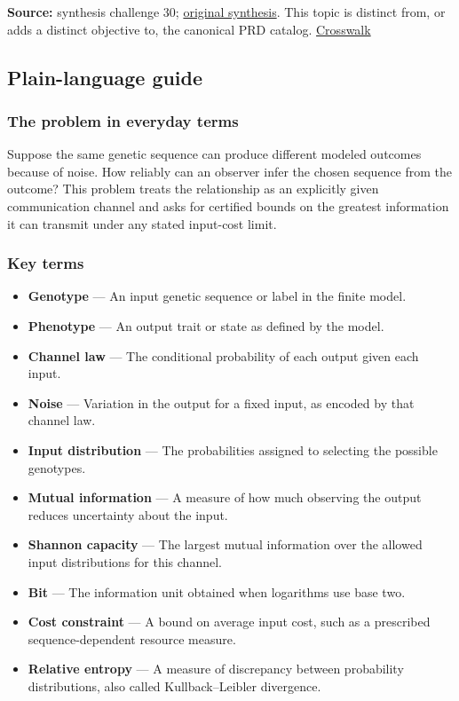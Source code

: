 \documentclass[
  11pt,
]{article}
\begin{document}
\textbf{Source:} synthesis challenge 30;
\href{https://github.com/rick-stevens-ai/Pure-Thought/blob/main/NOTES/30-Most-Compelling-Pure-Thought-AI-Challenges.md}{original
synthesis}. This topic is distinct from, or adds a distinct objective
to, the canonical PRD catalog.
\href{https://github.com/rick-stevens-ai/Pure-Thought/blob/main/reviews/SYNTHESIS-CROSSWALK.md}{Crosswalk}

\subsection{Plain-language guide}

\subsubsection{The problem in everyday terms}

Suppose the same genetic sequence can produce different modeled outcomes
because of noise. How reliably can an observer infer the chosen sequence
from the outcome? This problem treats the relationship as an explicitly
given communication channel and asks for certified bounds on the
greatest information it can transmit under any stated input-cost limit.

\subsubsection{Key terms}

\begin{itemize}
\item
  \textbf{Genotype} --- An input genetic sequence or label in the finite
  model.
\item
  \textbf{Phenotype} --- An output trait or state as defined by the
  model.
\item
  \textbf{Channel law} --- The conditional probability of each output
  given each input.
\item
  \textbf{Noise} --- Variation in the output for a fixed input, as
  encoded by that channel law.
\item
  \textbf{Input distribution} --- The probabilities assigned to
  selecting the possible genotypes.
\item
  \textbf{Mutual information} --- A measure of how much observing the
  output reduces uncertainty about the input.
\item
  \textbf{Shannon capacity} --- The largest mutual information over the
  allowed input distributions for this channel.
\item
  \textbf{Bit} --- The information unit obtained when logarithms use
  base two.
\item
  \textbf{Cost constraint} --- A bound on average input cost, such as a
  prescribed sequence-dependent resource measure.
\item
  \textbf{Relative entropy} --- A measure of discrepancy between
  probability distributions, also called Kullback--Leibler divergence.
\end{itemize}
\end{document}

